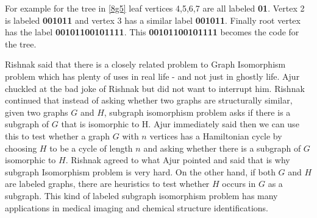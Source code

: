 For example for the tree in \ref{8g5} leaf vertices 4,5,6,7 are all labeled \textbf{01}. Vertex 2 is labeled \textbf{001011} and vertex 3 has a similar label \textbf{001011}. Finally root vertex has the label \textbf{00101100101111}. This \textbf{00101100101111} becomes the code for the tree.

Rishnak said that there is a closely related problem to Graph Isomorphism problem which has plenty of uses in real life - and not just in ghostly life. Ajur chuckled at the bad joke of Rishnak but did not want to interrupt him. Rishnak continued that instead of asking whether two graphs are structurally similar, given two graphs $G$ and $H$, subgraph isomorphism problem asks if there is a subgraph of $G$ that is isomorphic to H. Ajur immediately said then we can use this to test whether a graph $G$ with $n$ vertices has a Hamiltonian cycle by choosing $H$ to be a cycle of length $n$ and asking whether there is a subgraph of $G$ isomorphic to $H$. Rishnak agreed to what Ajur pointed and said that is why subgraph Isomorphism problem is very hard. On the other hand, if both $G$ and $H$ are labeled graphs, there are heuristics to test whether $H$ occurs in $G$ as a subgraph. This kind of labeled subgraph isomorphism problem has many applications in medical imaging and chemical structure identifications.

